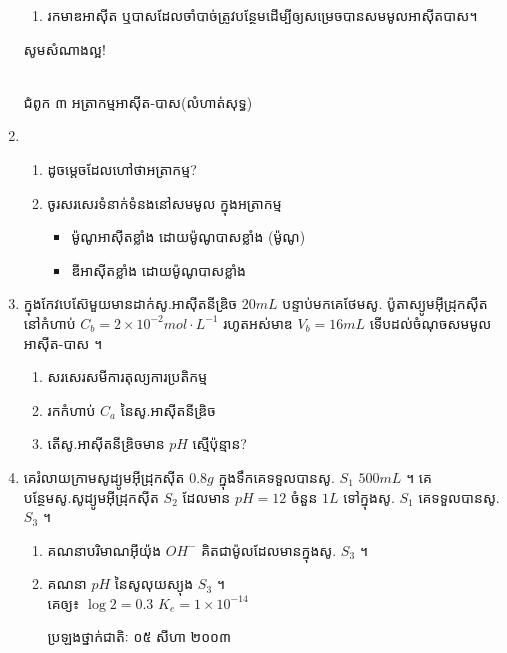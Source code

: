 \documentclass[12pt, a4paper]{article}
\begin{document}
\begin{enumerate}[m]
\begin{enumerate}[k]
		\item រកមាឌអាស៊ីត ឬបាសដែលចាំបាច់ត្រូវបន្ថែមដើម្បីឲ្យសម្រេចបានសមមូលអាស៊ីតបាស។
	\end{enumerate}
\begin{center}
	\sffamily\color{black}
	សូមសំណាងល្អ!
\end{center}
	\newpage
	\begin{center}
		\sffamily\color{black}
		\\
		ជំពូក ៣ អត្រាកម្មអាស៊ីត-បាស(លំហាត់សុទ្ធ)
	\end{center}
	\item\begin{enumerate}[k]
		\item ដូចម្តេចដែលហៅថាអត្រាកម្ម?
		\item ចូរសរសេរទំនាក់ទំនងនៅសមមូល ក្នុងអត្រាកម្ម
		\begin{itemize}
			\item ម៉ូណូអាស៊ីតខ្លាំង ដោយម៉ូណូបាសខ្លាំង (ម៉ូណូ)
			\item ឌីអាស៊ីតខ្លាំង ដោយម៉ូណូបាសខ្លាំង
		\end{itemize}
	\end{enumerate}
	\item ក្នុងកែវបេស៊ែមួយមានដាក់សូ.អាស៊ីតនីឌ្រិច $20mL$ បន្ទាប់មកគេថែមសូ. ប៉ូតាស្យូមអ៊ីដ្រុកស៊ីត នៅកំហាប់ $C_b=2\times10^{-2}mol\cdot L^{-1}$ រហូតអស់មាឌ $V_b=16mL$ ទើបដល់ចំណុចសមមូលអាស៊ីត-បាស ។
	\begin{enumerate}[k]
		\item សរសេរសមីការតុល្យការប្រតិកម្ម
		\item រកកំហាប់ $C_a$ នៃសូ.អាស៊ីតនីឌ្រិច
		\item តើសូ.អាស៊ីតនីឌ្រិចមាន $pH$ ស្មើប៉ុន្មាន?
	\end{enumerate}
	\item គេរំលាយក្រាមសូដ្យូមអ៊ីដ្រុកស៊ីត $0.8g$ ក្នុងទឹកគេទទួលបានសូ. $S_1$ $500mL$ ។ គេបន្ថែមសូ.សូដ្យូមអ៊ីដ្រុកស៊ីត $S_2$ ដែលមាន $pH=12$ ចំនួន $1L$ ទៅក្នុងសូ. $S_1$ គេទទួលបានសូ. $S_3$ ។
	\begin{enumerate}[k]
		\item គណនាបរិមាណអ៊ីយ៉ុង $OH^-$ គិតជាម៉ូលដែលមានក្នុងសូ. $S_3$ ។
		\item គណនា $pH$ នៃសូលុយស្យុង $S_3$ ។\\
		គេឲ្យ៖ $\log2=0.3$ $K_e=1\times10^{-14}$
		\begin{center}
			ប្រឡងថ្នាក់ជាតិៈ ០៥ សីហា ២០០៣
		\end{center}
	\end{enumerate}
	\begin{center}

\end{center}
\end{enumerate}
\end{document}
